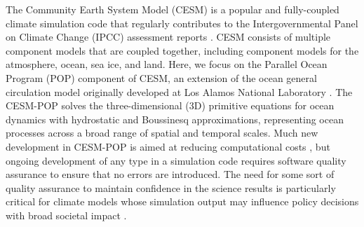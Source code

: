 \documentclass[gmd, manuscript]{copernicus}
\begin{document}
\introduction \label{sec:intro}


The Community Earth System Model (CESM) is a popular and fully-coupled climate simulation code \citep{cesm2013} that regularly contributes to the Intergovernmental Panel on Climate Change (IPCC) assessment reports \citep[e.g.,][]{stocker2013ipcc}.  CESM consists of multiple component models that are coupled together, including component models for the atmosphere, ocean, sea ice, and land.  Here, we focus on the Parallel Ocean Program (POP) component of CESM, an extension of the ocean general circulation model originally developed at Los Alamos National Laboratory \citep{pop}.  The CESM-POP solves the three-dimensional (3D) primitive equations for ocean dynamics with hydrostatic and Boussinesq approximations, representing ocean processes across a broad range of spatial and temporal scales.
Much new development in CESM-POP is aimed at reducing computational costs \citep[e.g.,][]{yong2015}, but ongoing development of any type in a simulation code requires software quality assurance to ensure that no errors are introduced.  The need for some sort of quality assurance to maintain confidence in the science results is particularly critical for climate models whose simulation output may influence policy decisions with broad societal impact \citep{carson2002, easterbrook2011}.
\end{document}
